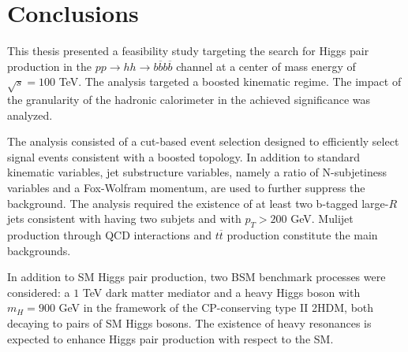 
\chapter{Conclusions}
\label{chapter:conclusions}

This thesis presented a feasibility study targeting the search for Higgs pair production in the $pp\rightarrow hh\rightarrow b\overline{b}b\overline{b}$ channel at a center of mass energy of $\sqrt{s}=100$ TeV. The analysis targeted a boosted kinematic regime. The impact of the granularity of the hadronic calorimeter in the achieved significance was analyzed.

The analysis consisted of a cut-based event selection designed to efficiently select signal events consistent with a boosted topology. In addition to standard kinematic variables, jet substructure variables, namely a ratio of N-subjetiness variables and a Fox-Wolfram momentum, are used to further suppress the background. The analysis required the existence of at least two b-tagged large-$R$ jets consistent with having two subjets and with $p_T>200$ GeV. Mulijet production through QCD interactions and $t\overline{t}$ production constitute the main backgrounds.  

In addition to SM Higgs pair production, two BSM benchmark processes were considered: a $1$ TeV dark matter mediator and a heavy Higgs boson with $m_H=900$ GeV in the framework of the CP-conserving type II 2HDM, both decaying to pairs of SM Higgs bosons. The existence of heavy resonances is expected to enhance Higgs pair production with respect to the SM.

